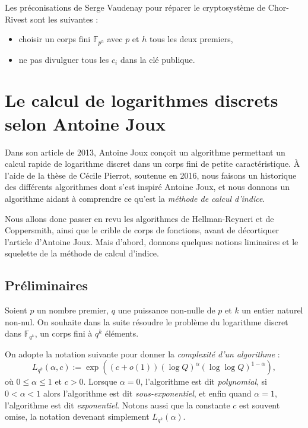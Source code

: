 \documentclass[a4paper, titlepage, 11pt]{article}
\theoremstyle{definition}
\theoremstyle{remark}
\def\o{o}
\def\gf #1{\mathbb{F}_{#1}}
\begin{document}
Les préconisations de Serge Vaudenay pour réparer le cryptosystème de Chor-Rivest sont les suivantes : \begin{itemize}
\item choisir un corps fini $\gf{p^h}$ avec $p$ et $h$ tous les deux premiers,
\item ne pas divulguer tous les $c_i$ dans la clé publique.
\end{itemize}

\section{Le calcul de logarithmes discrets selon Antoine Joux}\label{sec:DLPJoux}

Dans son article \cite{joux2013} de 2013, Antoine Joux conçoit un algorithme permettant un calcul rapide de logarithme discret dans un corps fini de petite caractéristique. À l'aide de la thèse \cite{pierrot2016} de Cécile Pierrot, soutenue en 2016, nous faisons un historique des différents algorithmes dont s'est inspiré Antoine Joux, et nous donnons un algorithme aidant à comprendre ce qu'est la \textit{méthode de calcul d'indice}.

Nous allons donc passer en revu les algorithmes de Hellman-Reyneri et de Coppersmith, ainsi que le crible de corps de fonctions, avant de décortiquer l'article \cite{joux2013} d'Antoine Joux. Mais d’abord, donnons quelques notions liminaires et le squelette de la méthode de calcul d’indice.

\subsection{Préliminaires}

Soient $p$ un nombre premier, $q$ une puissance non-nulle de $p$ et $k$ un entier naturel non-nul. On souhaite dans la suite résoudre le problème du logarithme discret dans $\gf{q^k}$, un corps fini à $q^k$ éléments.

On adopte la notation suivante pour donner la \textit{complexité d'un algorithme} :
$$L_{q^k}(\alpha, c) := \exp\left({(c+\o(1))(\log Q)^\alpha(\log\log Q)^{1 - \alpha}}\right),$$
où $0 \leqslant \alpha\leqslant 1$ et $c > 0$. Lorsque $\alpha = 0$, l'algorithme est dit \textit{polynomial}, si $0 < \alpha < 1$ alors l'algorithme est dit \textit{sous-exponentiel}, et enfin quand $\alpha = 1$, l'algorithme est dit \textit{exponentiel}. Notons aussi que la constante $c$ est souvent omise, la notation devenant simplement $L_{q^k}(\alpha)$.
\end{document}
